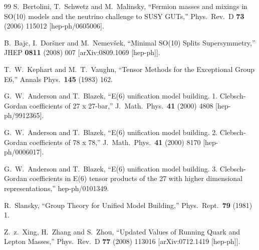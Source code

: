 \documentclass[a4paper,12pt]{article}
\begin{document}
\begin{thebibliography}{99}
  S.~Bertolini, T.~Schwetz and M.~Malinsky,
  ``Fermion masses and mixings in SO(10) models and the neutrino challenge to SUSY GUTs,''
  Phys.\ Rev.\ D {\bf 73} (2006) 115012
  [hep-ph/0605006].

B.~Bajc, I.~Dor\v sner and M.~Nemev\v sek,
``Minimal SO(10) Splits Supersymmetry,''
JHEP {\bf 0811} (2008) 007
[arXiv:0809.1069 [hep-ph]].

  T.~W.~Kephart and M.~T.~Vaughn,
  ``Tensor Methods for the Exceptional Group E6,''
  Annals Phys.\  {\bf 145} (1983) 162.

  G.~W.~Anderson and T.~Blazek,
  ``E(6) unification model building. 1. Clebsch-Gordan coefficients of 27 x 27-bar,''
  J.\ Math.\ Phys.\  {\bf 41} (2000) 4808
  [hep-ph/9912365].

  G.~W.~Anderson and T.~Blazek,
  ``E(6) unification model building. 2. Clebsch-Gordan coefficients of 78 x 78,''
  J.\ Math.\ Phys.\  {\bf 41} (2000) 8170
  [hep-ph/0006017].

  G.~W.~Anderson and T.~Blazek,
  ``E(6) unification model building. 3. Clebsch-Gordan coefficients in E(6) tensor products of the 27 with higher dimensional representations,''
  hep-ph/0101349.

  R.~Slansky,
  ``Group Theory for Unified Model Building,''
  Phys.\ Rept.\  {\bf 79} (1981) 1.


  Z.~z.~Xing, H.~Zhang and S.~Zhou,
  ``Updated Values of Running Quark and Lepton Masses,''
  Phys.\ Rev.\ D {\bf 77} (2008) 113016
  [arXiv:0712.1419 [hep-ph]].


\end{thebibliography}
\end{document}
